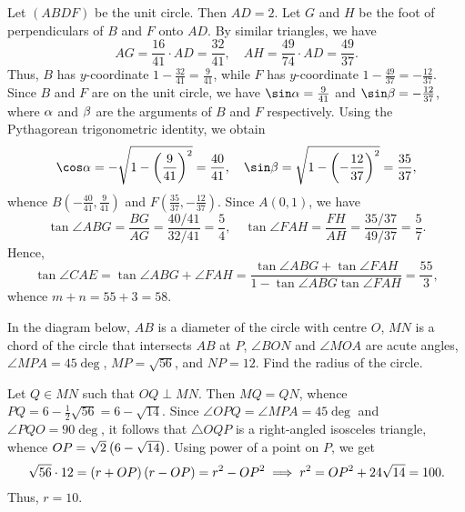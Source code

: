 \begin{solution*}
    Let $(ABDF)$ be the unit circle. Then $AD = 2$. Let $G$ and $H$ be the foot of perpendiculars of $B$ and $F$ onto $AD$. By similar triangles, we have \[AG = \frac{16}{41} \cdot AD = \frac{32}{41}, \quad AH = \frac{49}{74} \cdot AD = \frac{49}{37}.\] Thus, $B$ has $y$-coordinate $1 - \frac{32}{41} = \frac{9}{41}$, while $F$ has $y$-coordinate $1 - \frac{49}{37} = -\frac{12}{37}$. Since $B$ and $F$ are on the unit circle, we have $\sin \a = \frac{9}{41}$ and $\sin \b = -\frac{12}{37}$, where $\alpha$ and $\beta$ are the arguments of $B$ and $F$ respectively. Using the Pythagorean trigonometric identity, we obtain \[\cos \a = -\sqrt{1 - \bp{\frac{9}{41}}^2} = \frac{40}{41}, \quad \sin \b = \sqrt{1 - \bp{-\frac{12}{37}}^2} = \frac{35}{37},\] whence $B(-\frac{40}{41}, \frac{9}{41})$ and $F(\frac{35}{37}, -\frac{12}{37})$. Since $A(0, 1)$, we have \[\tan \angle ABG = \frac{BG}{AG} = \frac{40/41}{32/41} = \frac54, \quad \tan \angle FAH = \frac{FH}{AH} = \frac{35/37}{49/37} = \frac{5}{7}.\] Hence, \[\tan \angle CAE = \tan{\angle ABG + \angle FAH} = \frac{\tan \angle ABG + \tan \angle FAH}{1 - \tan \angle ABG \tan \angle FAH} = \frac{55}{3},\] whence $m + n = 55 + 3 = 58$.
\end{solution*}

\begin{question}[10]\label{Q::2023-S-1-17}
    In the diagram below, $AB$ is a diameter of the circle with centre $O$, $MN$ is a chord of the circle that intersects $AB$ at $P$, $\angle BON$ and $\angle MOA$ are acute angles, $\angle MPA = 45\deg$, $MP = \sqrt{56}$, and $NP = 12$. Find the radius of the circle.

    \begin{center}
    \end{center}
\end{question}
\begin{solution*}
    Let $Q \in MN$ such that $OQ \perp MN$. Then $MQ = QN$, whence $PQ = 6 - \frac12 \sqrt{56} = 6 - \sqrt{14}$. Since $\angle OPQ = \angle MPA = 45\deg$ and $\angle PQO = 90\deg$, it follows that $\triangle OQP$ is a right-angled isosceles triangle, whence $OP = \sqrt{2} \left( 6 - \sqrt{14} \right)$. Using power of a point on $P$, we get \[\sqrt{56} \cdot 12 = \left( r + OP \right)\left( r - OP \right) = r^2 - OP^2 \implies r^2 = OP^2 + 24\sqrt{14} = 100.\] Thus, $r = 10$.
\end{solution*}

